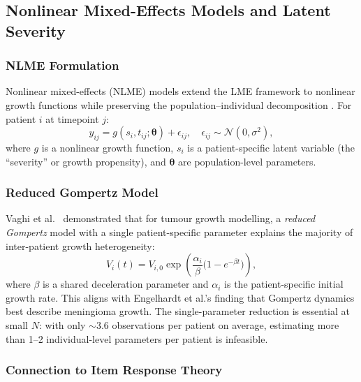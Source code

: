 \subsection{Nonlinear Mixed-Effects Models and Latent Severity}
\label{sec:bg:nlme}

\subsubsection{NLME Formulation}

Nonlinear mixed-effects (NLME) models extend the LME framework to nonlinear
growth functions while preserving the population--individual decomposition
\cite{pinheiro2000mixed}. For patient $i$ at timepoint $j$:
\begin{equation}
  y_{ij} = g(s_i, t_{ij}; \boldsymbol{\theta}) + \epsilon_{ij},
  \quad \epsilon_{ij} \sim \mathcal{N}(0, \sigma^2),
  \label{eq:nlme}
\end{equation}
where $g$ is a nonlinear growth function, $s_i$ is a patient-specific latent
variable (the ``severity'' or growth propensity), and $\boldsymbol{\theta}$
are population-level parameters.

\subsubsection{Reduced Gompertz Model}

Vaghi et al.\ \cite{vaghi2020reduced} demonstrated that for tumour growth
modelling, a \emph{reduced Gompertz} model with a single patient-specific
parameter explains the majority of inter-patient growth heterogeneity:
\begin{equation}
  V_i(t) = V_{i,0} \exp\!\left(\frac{\alpha_i}{\beta}
    \bigl(1 - e^{-\beta t}\bigr)\right),
  \label{eq:reduced_gompertz}
\end{equation}
where $\beta$ is a shared deceleration parameter and $\alpha_i$ is the
patient-specific initial growth rate. This aligns with Engelhardt et al.'s
finding \cite{engelhardt2023gompertz} that Gompertz dynamics best describe
meningioma growth. The single-parameter reduction is essential at small $N$:
with only $\sim$3.6 observations per patient on average, estimating more than
1--2 individual-level parameters per patient is infeasible.

\subsubsection{Connection to Item Response Theory}

